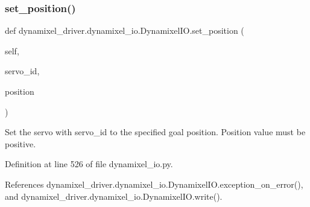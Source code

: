 \subsubsection{\texorpdfstring{set\+\_\+position()}{set\_position()}}
{\footnotesize\ttfamily def dynamixel\+\_\+driver.\+dynamixel\+\_\+io.\+Dynamixel\+I\+O.\+set\+\_\+position (\begin{DoxyParamCaption}\item[{}]{self,  }\item[{}]{servo\+\_\+id,  }\item[{}]{position }\end{DoxyParamCaption})}

\begin{DoxyVerb}Set the servo with servo_id to the specified goal position.
Position value must be positive.
\end{DoxyVerb}
 

Definition at line 526 of file dynamixel\+\_\+io.\+py.



References dynamixel\+\_\+driver.\+dynamixel\+\_\+io.\+Dynamixel\+I\+O.\+exception\+\_\+on\+\_\+error(), and dynamixel\+\_\+driver.\+dynamixel\+\_\+io.\+Dynamixel\+I\+O.\+write().


